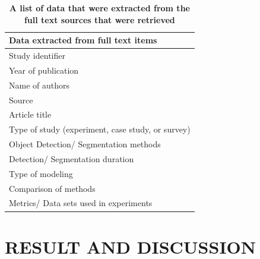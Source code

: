 \documentclass[two column]{ieeeaccess}
\begin{document}
\begin{table}[h]
\begin{center}
\caption{\textbf{A list of data that were extracted from the full text sources that were retrieved }}
\begin{tabular}{l}
\hline
        Data extracted from full text items    \\ 
\hline
        Study identifier \\
        Year of publication \\
        Name of authors \\
        Source \\
        Article title \\
        Type of study (experiment, case study, or survey) \\
        Object Detection/ Segmentation methods \\
        Detection/ Segmentation duration \\
        Type of modeling \\
        Comparison of methods \\
        Metrics/ Data sets used in experiments \\
\hline
\end{tabular}
\end{center}
\end{table}

\section{RESULT AND DISCUSSION}
\end{document}
